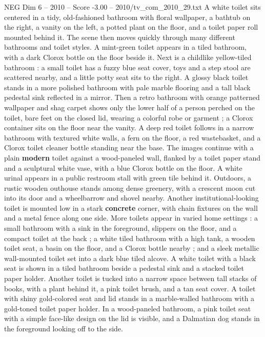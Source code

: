 \begin{textsample}{NEG Dim 6 – 2010 – Score -3.00 – 2010/tv\_com\_2010\_29.txt}  \label{ex:f6_neg_005}
A white toilet sits centered in a tidy, old-fashioned bathroom with floral wallpaper, a bathtub on the right, a vanity on the left, a potted plant on the floor, and a toilet paper roll mounted behind it.
The scene then moves quickly through many different bathrooms and toilet styles.
A mint-green toilet appears in a tiled bathroom, with a dark Clorox bottle on the floor beside it.
Next is a childlike yellow-tiled bathroom : a small toilet has a fuzzy blue seat cover, toys and a step stool are scattered nearby, and a little potty seat sits to the right.
A glossy black toilet stands in a more polished bathroom with pale marble flooring and a tall black pedestal sink reflected in a mirror.
Then a retro bathroom with orange patterned wallpaper and shag carpet shows only the lower half of a person perched on the toilet, bare feet on the closed lid, wearing a colorful robe or garment ; a Clorox container sits on the floor near the vanity.
A deep red toilet follows in a narrow bathroom with textured white walls, a fern on the floor, a red wastebasket, and a Clorox toilet cleaner bottle standing near the base.
The images continue with a plain \textbf{modern} toilet against a wood-paneled wall, flanked by a toilet paper stand and a sculptural white vase, with a blue Clorox bottle on the floor.
A white urinal appears in a public restroom stall with green tile behind it.
Outdoors, a rustic wooden outhouse stands among dense greenery, with a crescent moon cut into its door and a wheelbarrow and shovel nearby.
Another institutional-looking toilet is mounted low in a stark \textbf{concrete} corner, with chain fixtures on the wall and a metal fence along one side.
More toilets appear in varied home settings : a small bathroom with a sink in the foreground, slippers on the floor, and a compact toilet at the back ; a white tiled bathroom with a high tank, a wooden toilet seat, a basin on the floor, and a Clorox bottle nearby ; and a sleek metallic wall-mounted toilet set into a dark blue tiled alcove.
A white toilet with a black seat is shown in a tiled bathroom beside a pedestal sink and a stacked toilet paper holder.
Another toilet is tucked into a narrow space between tall stacks of books, with a plant behind it, a pink toilet brush, and a tan seat cover.
A toilet with shiny gold-colored seat and lid stands in a marble-walled bathroom with a gold-toned toilet paper holder.
In a wood-paneled bathroom, a pink toilet seat with a simple face-like design on the lid is visible, and a Dalmatian dog stands in the foreground looking off to the side.

\end{textsample}
